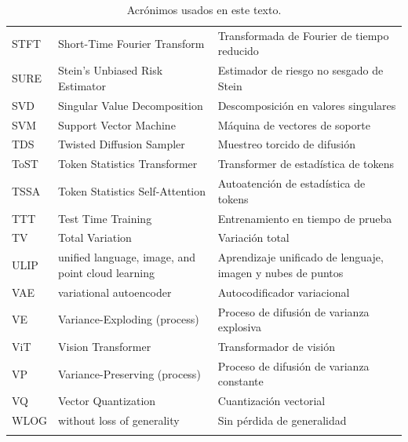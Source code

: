 \documentclass[../book-main_es.tex]{subfiles}
\begin{document}
\begin{longtable}{@{} p{} @{\hspace{1em}} p{} @{\hspace{1em}} p{}}
STFT & Short-Time Fourier Transform & Transformada de Fourier de tiempo reducido \\
SURE & Stein's Unbiased Risk Estimator & Estimador de riesgo no sesgado de Stein \\
SVD & Singular Value Decomposition & Descomposición en valores singulares \\
SVM & Support Vector Machine & Máquina de vectores de soporte \\
TDS & Twisted Diffusion Sampler & Muestreo torcido de difusión \\
ToST & Token Statistics Transformer & Transformer de estadística de tokens \\
TSSA & Token Statistics Self-Attention & Autoatención de estadística de tokens \\
TTT & Test Time Training & Entrenamiento en tiempo de prueba \\
TV & Total Variation & Variación total \\
ULIP & unified language, image, and point cloud learning & Aprendizaje unificado de lenguaje, imagen y nubes de puntos \\
VAE & variational autoencoder & Autocodificador variacional \\
VE & Variance-Exploding (process) & Proceso de difusión de varianza explosiva \\
ViT & Vision Transformer & Transformador de visión \\
VP & Variance-Preserving (process) & Proceso de difusión de varianza constante \\
VQ & Vector Quantization & Cuantización vectorial \\
WLOG & without loss of generality & Sin pérdida de generalidad \\
\hline
\caption{Acrónimos usados en este texto.}
\label{tab:basic}
\end{longtable}
\end{document}

